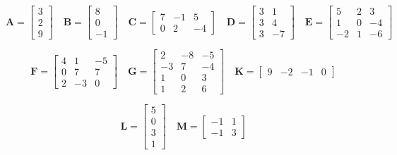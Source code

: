 \documentclass[
]{article}
\begin{document}
\[
\mathbf{A} = \left[
  \begin{array}{r}
    3 \\
    2 \\
    9
  \end{array}
\right]
\quad
\mathbf{B} = \left[
  \begin{array}{r}
    8 \\
    0 \\
    -1
  \end{array}
\right]
\quad
\mathbf{C} = \left[
  \begin{array}{rrr}
    7 & -1 & 5 \\
    0 & 2 & -4
  \end{array}
\right]
\quad
\mathbf{D} = \left[
  \begin{array}{rr}
    3 & 1 \\
    3 & 4 \\
    3 & -7
  \end{array}
\right]
\quad
\mathbf{E} = \left[
  \begin{array}{rrr}
    5 & 2 & 3 \\
    1 & 0 & -4 \\
    -2 & 1 & -6
  \end{array}
\right]
\]

\[
\mathbf{F} = \left[
  \begin{array}{rrr}
    4 & 1 & -5 \\
    0 & 7 & 7 \\
    2 & -3 & 0
  \end{array}
\right]
\quad
\mathbf{G} = \left[
  \begin{array}{rrr}
    2 & -8 & -5 \\
    -3 & 7 & -4 \\
    1 & 0 & 3 \\
    1 & 2 & 6
  \end{array}
\right]
\quad
\mathbf{K} = \left[
  \begin{array}{rrrr}
    9 & 
    -2 &
    -1 &
    0
  \end{array}
\right]
\]

\[
\mathbf{L} = \left[
  \begin{array}{r}
    5 \\ 0 \\ 3 \\ 1
  \end{array}
\right]
\quad
\mathbf{M} = \begin{bmatrix}
-1 & 1 \\
-1 & 3
\end{bmatrix}
\]
\end{document}
